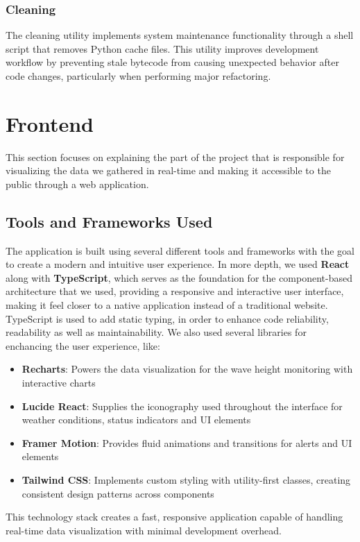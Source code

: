 \documentclass{article}
\begin{document}
    \subsubsection{Cleaning}
    The cleaning utility implements system maintenance functionality through a shell script that removes Python cache files. This utility improves development workflow by preventing stale bytecode from causing unexpected behavior after code changes, particularly when performing major refactoring.

\section{Frontend}
This section focuses on explaining the part of the project that is responsible for visualizing the data we gathered in real-time and making it accessible to the public through a web application.
\subsection{Tools and Frameworks Used}
    The application is built using several different tools and frameworks with the goal to create a modern and intuitive user experience. In more depth, we used \textbf{React} along with \textbf{TypeScript}, which serves as the foundation for the component-based architecture that we used, providing a responsive and interactive user interface, making it feel closer to a native application instead of a traditional website. TypeScript is used to add static typing, in order to enhance code reliability, readability as well as maintainability. We also used several libraries for enchancing the user experience, like:
    \begin{itemize}
        \item \textbf{Recharts}: Powers the data visualization for the wave height monitoring with interactive charts
        \item \textbf{Lucide React}: Supplies the iconography used throughout the interface for weather conditions, status indicators and UI elements
        \item \textbf{Framer Motion}: Provides fluid animations and transitions for alerts and UI elements
        \item \textbf{Tailwind CSS}: Implements custom styling with utility-first classes, creating consistent design patterns across components
    \end{itemize}
    This technology stack creates a fast, responsive application capable of handling real-time data visualization with minimal development overhead.
        
\end{document}
